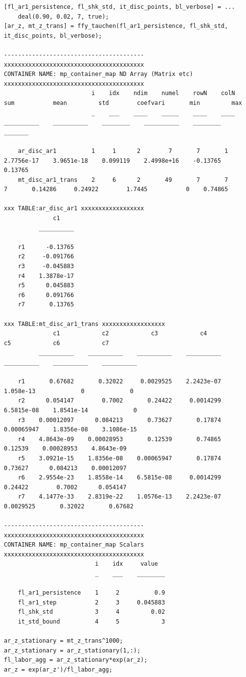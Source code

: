 \documentclass[
]{book}
\begin{document}
\begin{verbatim}
[fl_ar1_persistence, fl_shk_std, it_disc_points, bl_verbose] = ...
    deal(0.90, 0.02, 7, true);
[ar_z, mt_z_trans] = ffy_tauchen(fl_ar1_persistence, fl_shk_std, it_disc_points, bl_verbose);

----------------------------------------
xxxxxxxxxxxxxxxxxxxxxxxxxxxxxxxxxxxxxxxx
CONTAINER NAME: mp_container_map ND Array (Matrix etc)
xxxxxxxxxxxxxxxxxxxxxxxxxxxxxxxxxxxxxxxx
                         i    idx    ndim    numel    rowN    colN       sum           mean         std        coefvari       min         max  
                         _    ___    ____    _____    ____    ____    __________    __________    ________    __________    ________    _______

    ar_disc_ar1          1     1      2        7       7       1      2.7756e-17    3.9651e-18    0.099119    2.4998e+16    -0.13765    0.13765
    mt_disc_ar1_trans    2     6      2       49       7       7               7       0.14286     0.24922        1.7445           0    0.74865

xxx TABLE:ar_disc_ar1 xxxxxxxxxxxxxxxxxx
              c1    
          __________

    r1      -0.13765
    r2     -0.091766
    r3     -0.045883
    r4    1.3878e-17
    r5      0.045883
    r6      0.091766
    r7       0.13765

xxx TABLE:mt_disc_ar1_trans xxxxxxxxxxxxxxxxxx
              c1            c2            c3            c4            c5            c6            c7    
          __________    __________    __________    __________    __________    __________    __________

    r1       0.67682       0.32022     0.0029525    2.2423e-07     1.058e-13             0             0
    r2      0.054147        0.7002       0.24422     0.0014299    6.5815e-08    1.8541e-14             0
    r3    0.00012097      0.084213       0.73627       0.17874    0.00065947    1.8356e-08    3.1086e-15
    r4    4.8643e-09    0.00028953       0.12539       0.74865       0.12539    0.00028953    4.8643e-09
    r5    3.0921e-15    1.8356e-08    0.00065947       0.17874       0.73627      0.084213    0.00012097
    r6    2.9554e-23    1.8558e-14    6.5815e-08     0.0014299       0.24422        0.7002      0.054147
    r7    4.1477e-33    2.8319e-22    1.0576e-13    2.2423e-07     0.0029525       0.32022       0.67682

----------------------------------------
xxxxxxxxxxxxxxxxxxxxxxxxxxxxxxxxxxxxxxxx
CONTAINER NAME: mp_container_map Scalars
xxxxxxxxxxxxxxxxxxxxxxxxxxxxxxxxxxxxxxxx
                          i    idx     value  
                          _    ___    ________

    fl_ar1_persistence    1     2          0.9
    fl_ar1_step           2     3     0.045883
    fl_shk_std            3     4         0.02
    it_std_bound          4     5            3

ar_z_stationary = mt_z_trans^1000;
ar_z_stationary = ar_z_stationary(1,:);
fl_labor_agg = ar_z_stationary*exp(ar_z);
ar_z = exp(ar_z')/fl_labor_agg;
\end{verbatim}
\end{document}
